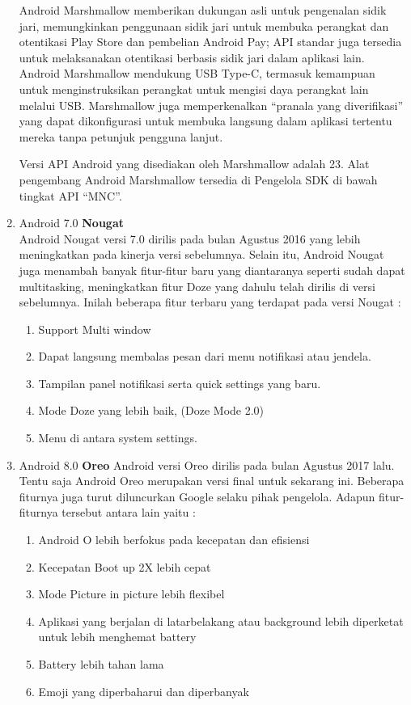 \begin{enumerate}
Android Marshmallow memberikan dukungan asli untuk pengenalan sidik jari, memungkinkan penggunaan sidik jari untuk membuka perangkat dan otentikasi Play Store dan pembelian Android Pay; API standar juga tersedia untuk melaksanakan otentikasi berbasis sidik jari dalam aplikasi lain. Android Marshmallow mendukung USB Type-C, termasuk kemampuan untuk menginstruksikan perangkat untuk mengisi daya perangkat lain melalui USB. Marshmallow juga memperkenalkan “pranala yang diverifikasi” yang dapat dikonfigurasi untuk membuka langsung dalam aplikasi tertentu mereka tanpa petunjuk pengguna lanjut.

Versi API Android yang disediakan oleh Marshmallow adalah 23. Alat pengembang Android Marshmallow tersedia di Pengelola SDK di bawah tingkat API “MNC”.

\item Android 7.0 \textbf{Nougat}\\
Android Nougat versi 7.0 dirilis pada bulan Agustus 2016 yang lebih meningkatkan pada kinerja versi sebelumnya. Selain itu, Android Nougat juga menambah banyak fitur-fitur baru yang diantaranya seperti sudah dapat multitasking, meningkatkan fitur Doze yang dahulu telah dirilis di versi sebelumnya. Inilah beberapa fitur terbaru yang terdapat pada versi Nougat :
\begin{enumerate}
    \item Support Multi window
    \item Dapat langsung membalas pesan dari menu notifikasi atau jendela.
    \item Tampilan panel notifikasi serta quick settings yang baru.
    \item Mode Doze yang lebih baik, (Doze Mode 2.0)
    \item Menu di antara system settings.
\end{enumerate}

\item Android 8.0 \textbf{Oreo}
Android versi Oreo dirilis pada bulan Agustus 2017 lalu. Tentu saja Android Oreo merupakan versi final untuk sekarang ini. Beberapa fiturnya juga turut diluncurkan Google selaku pihak pengelola. Adapun fitur-fiturnya tersebut antara lain yaitu :
\begin{enumerate}
    \item Android O lebih berfokus pada kecepatan dan efisiensi
    \item Kecepatan Boot up 2X lebih cepat
    \item Mode Picture in picture lebih flexibel
    \item Aplikasi yang berjalan di latarbelakang atau background lebih diperketat untuk lebih menghemat battery
    \item Battery lebih tahan lama
    \item Emoji yang diperbaharui dan diperbanyak
\end{enumerate}
\end{enumerate}

